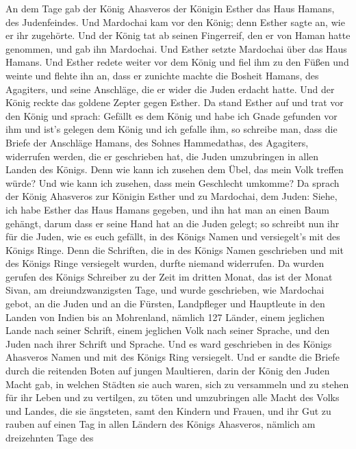  An dem Tage gab der König Ahasveros der Königin Esther
das Haus Hamans, des Judenfeindes. Und Mardochai kam vor den König; denn
Esther sagte an, wie er ihr zugehörte.  Und der König tat
ab seinen Fingerreif, den er von Haman hatte genommen, und gab ihn
Mardochai. Und Esther setzte Mardochai über das Haus Hamans.
 Und Esther redete weiter vor dem König und fiel ihm zu
den Füßen und weinte und flehte ihn an, dass er zunichte machte die
Bosheit Hamans, des Agagiters, und seine Anschläge, die er wider die
Juden erdacht hatte.  Und der König reckte das goldene
Zepter gegen Esther. Da stand Esther auf und trat vor den König
 und sprach: Gefällt es dem König und habe ich Gnade
gefunden vor ihm und ist's gelegen dem König und ich gefalle ihm, so
schreibe man, dass die Briefe der Anschläge Hamans, des Sohnes
Hammedathas, des Agagiters, widerrufen werden, die er geschrieben hat,
die Juden umzubringen in allen Landen des Königs.  Denn
wie kann ich zusehen dem Übel, das mein Volk treffen würde? Und wie kann
ich zusehen, dass mein Geschlecht umkomme?  Da sprach der
König Ahasveros zur Königin Esther und zu Mardochai, dem Juden: Siehe,
ich habe Esther das Haus Hamans gegeben, und ihn hat man an einen Baum
gehängt, darum dass er seine Hand hat an die Juden gelegt;
 so schreibt nun ihr für die Juden, wie es euch gefällt,
in des Königs Namen und versiegelt's mit des Königs Ringe. Denn die
Schriften, die in des Königs Namen geschrieben und mit des Königs Ringe
versiegelt wurden, durfte niemand widerrufen.  Da wurden
gerufen des Königs Schreiber zu der Zeit im dritten Monat, das ist der
Monat Sivan, am dreiundzwanzigsten Tage, und wurde geschrieben, wie
Mardochai gebot, an die Juden und an die Fürsten, Landpfleger und
Hauptleute in den Landen von Indien bis an Mohrenland, nämlich 127
Länder, einem jeglichen Lande nach seiner Schrift, einem jeglichen Volk
nach seiner Sprache, und den Juden nach ihrer Schrift und Sprache.
 Und es ward geschrieben in des Königs Ahasveros Namen
und mit des Königs Ring versiegelt. Und er sandte die Briefe durch die
reitenden Boten auf jungen Maultieren,  darin der König
den Juden Macht gab, in welchen Städten sie auch waren, sich zu
versammeln und zu stehen für ihr Leben und zu vertilgen, zu töten und
umzubringen alle Macht des Volks und Landes, die sie ängsteten, samt den
Kindern und Frauen, und ihr Gut zu rauben  auf einen Tag
in allen Ländern des Königs Ahasveros, nämlich am dreizehnten Tage des
